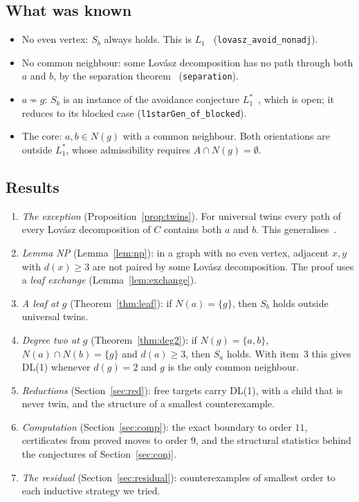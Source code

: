\documentclass[11pt]{amsart}
\theoremstyle{definition}
\begin{document}
\subsection*{What was known}
\begin{itemize}
\item No even vertex: $S_b$ always holds. This is $L_1$~\cite[Theorem~6.3]{RD}
(\texttt{lovasz\_avoid\_nonadj}).
\item No common neighbour: some Lov\'asz decomposition has no path through both $a$ and $b$, by the
separation theorem~\cite[Theorem~6.1]{RD} (\texttt{separation}).
\item $a\not\sim g$: $S_b$ is an instance of the avoidance conjecture $L_1^*$~\cite{L1S}, which is
open; it reduces to its blocked case (\texttt{l1starGen\_of\_blocked}).
\item The core: $a,b\in N(g)$ with a common neighbour. Both orientations are outside $L_1^*$, whose
admissibility requires $A\cap N(g)=\emptyset$.
\end{itemize}

\subsection*{Results}
\begin{enumerate}
\item \emph{The exception} (Proposition~\ref{prop:twins}). For universal twins every path of every
Lov\'asz decomposition of $C$ contains both $a$ and $b$. This generalises~\cite[Prop.~7.5]{DT}.
\item \emph{Lemma NP} (Lemma~\ref{lem:np}): in a graph with no even vertex, adjacent $x,y$ with
$d(x)\ge3$ are not paired by some Lov\'asz decomposition. The proof uses a \emph{leaf exchange}
(Lemma~\ref{lem:exchange}).
\item \emph{A leaf at $g$} (Theorem~\ref{thm:leaf}): if $N(a)=\{g\}$, then $S_b$ holds outside
universal twins.
\item \emph{Degree two at $g$} (Theorem~\ref{thm:deg2}): if $N(g)=\{a,b\}$, $N(a)\cap N(b)=\{g\}$
and $d(a)\ge3$, then $S_a$ holds. With item~3 this gives DL(1) whenever $d(g)=2$ and $g$ is the
only common neighbour.
\item \emph{Reductions} (Section~\ref{sec:red}): free targets carry DL(1), with a child that is
never twin, and the structure of a smallest counterexample.
\item \emph{Computation} (Section~\ref{sec:comp}): the exact boundary to order $11$, certificates
from proved moves to order $9$, and the structural statistics behind the conjectures of
Section~\ref{sec:conj}.
\item \emph{The residual} (Section~\ref{sec:residual}): counterexamples of smallest order to each
inductive strategy we tried.
\end{enumerate}
\end{document}
